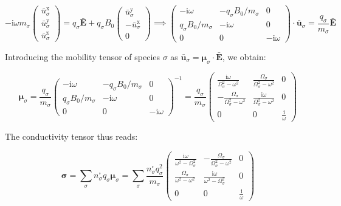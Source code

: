\begin{equation}
    -\mathrm{i}\omega m_\sigma\begin{pmatrix}
        \bar{u}_\sigma^\mathrm{x}\\
        \bar{u}_\sigma^\mathrm{y}\\
        \bar{u}_\sigma^\text{z}
    \end{pmatrix}=q_\sigma\bar{\mathbf{E}}+q_\sigma B_0\begin{pmatrix}
        \bar{u}_\sigma^\mathrm{y}\\
        -\bar{u}_\sigma^\mathrm{x}\\
        0
    \end{pmatrix}\implies\begin{pmatrix}
        -\mathrm{i}\omega & -q_\sigma B_0/m_\sigma & 0\\
        q_\sigma  B_0/m_\sigma & -\mathrm{i}\omega & 0\\
        0&0&-\mathrm{i}\omega
    \end{pmatrix}\cdot\bar{\mathbf{u}}_\sigma=\frac{q_\sigma}{m_\sigma}\bar{\mathbf{E}}
\end{equation}

Introducing the mobility tensor of species $\sigma$ as $\bar{\mathbf{u}}_\sigma=\boldsymbol{\mu}_\sigma\cdot\bar{\mathbf{E}}$, we obtain:

\begin{equation}
    \boldsymbol{\mu}_\sigma=\frac{q_\sigma}{m_\sigma}\begin{pmatrix}
        -\mathrm{i}\omega & -q_\sigma B_0/m_\sigma & 0\\
        q_\sigma  B_0/m_\sigma & -\mathrm{i}\omega & 0\\
        0&0&-\mathrm{i}\omega
    \end{pmatrix}^{-1}=\frac{q_\sigma}{m_\sigma}\begin{pmatrix}
        \frac{\mathrm{i}\omega}{\Omega_\sigma^2-\omega^2} & \frac{\Omega_\sigma}{\Omega_\sigma^2-\omega^2} & 0\\
        -\frac{\Omega_\sigma}{\Omega_\sigma^2-\omega^2} & \frac{\mathrm{i}\omega}{\Omega_\sigma^2-\omega^2} & 0\\
        0&0&\frac{\mathrm{i}}{\omega}
    \end{pmatrix}
\end{equation}

The conductivity tensor thus reads:

\begin{equation}
    \boldsymbol{\sigma}=\sum_\sigma n_\sigma^\square q_\sigma\boldsymbol{\mu}_\sigma=\sum_\sigma\frac{n_\sigma^\square q_\sigma^2}{m_\sigma}\begin{pmatrix}
        \frac{\mathrm{i}\omega}{\omega^2-\Omega_\sigma^2} & -\frac{\Omega_\sigma}{\Omega_\sigma^2-\omega^2} & 0\\
        \frac{\Omega_\sigma}{\omega^2-\omega^2} & \frac{\mathrm{i}\omega}{\omega^2-\Omega_\sigma^2} & 0\\
        0&0&\frac{\mathrm{i}}{\omega}
    \end{pmatrix}
\end{equation}

